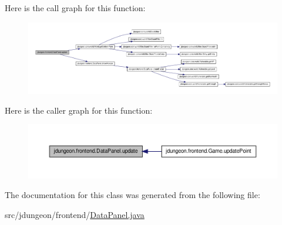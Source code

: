 Here is the call graph for this function:
\nopagebreak
\begin{figure}[H]
\begin{center}
\leavevmode
\includegraphics[width=400pt]{classjdungeon_1_1frontend_1_1_data_panel_a360c0ccfc1681743d6a5d8f3c01087ee_cgraph}
\end{center}
\end{figure}




Here is the caller graph for this function:
\nopagebreak
\begin{figure}[H]
\begin{center}
\leavevmode
\includegraphics[width=400pt]{classjdungeon_1_1frontend_1_1_data_panel_a360c0ccfc1681743d6a5d8f3c01087ee_icgraph}
\end{center}
\end{figure}




The documentation for this class was generated from the following file:\begin{DoxyCompactItemize}
\item 
src/jdungeon/frontend/\hyperlink{_data_panel_8java}{DataPanel.java}\end{DoxyCompactItemize}
